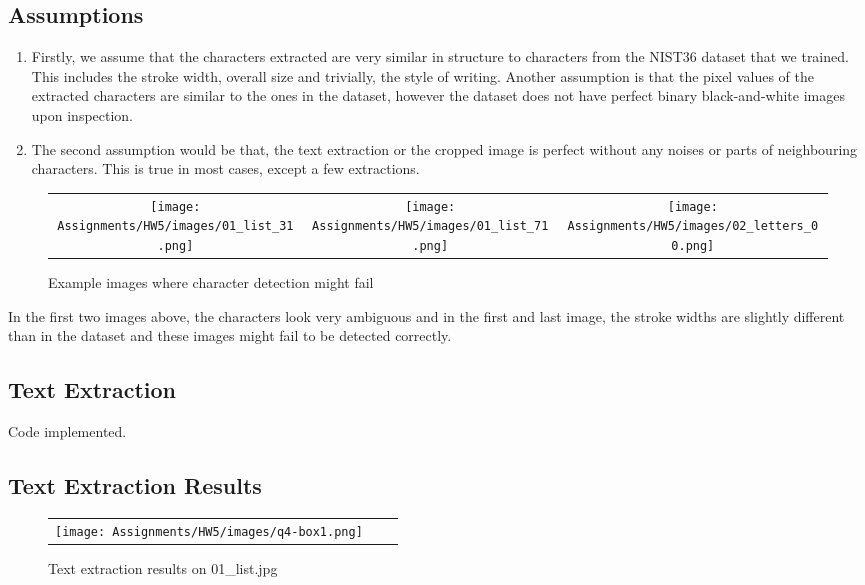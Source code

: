 \documentclass[a4paper]{article}
\begin{document}
\subsection{Assumptions}
\begin{enumerate}
    \item Firstly, we assume that the characters extracted are very similar in structure to characters from the NIST36 dataset that we trained. This includes the stroke width, overall size and trivially, the style of writing. Another assumption is that the pixel values of the extracted characters are similar to the ones in the dataset, however the dataset does not have perfect binary black-and-white images upon inspection.
    \item The second assumption would be that, the text extraction or the cropped image is perfect without any noises or parts of neighbouring characters. This is true in most cases, except a few extractions.
\end{enumerate}

\begin{figure}[!ht]
\centering
\begin{tabular}{ccc}
{\texttt{[image: Assignments/HW5/images/01\_list\_31.png]}} &
{\texttt{[image: Assignments/HW5/images/01\_list\_71.png]}} &
{\texttt{[image: Assignments/HW5/images/02\_letters\_00.png]}}
\end{tabular}
\caption{Example images where character detection might fail}
\end{figure}

In the first two images above, the characters look very ambiguous and in the first and last image, the stroke widths are slightly different than in the dataset and these images might fail to be detected correctly.

\subsection{Text Extraction}
Code implemented.

\subsection{Text Extraction Results}
\begin{figure}[!ht]
\centering
\begin{tabular}{ccc}
{\texttt{[image: Assignments/HW5/images/q4-box1.png]}}
\end{tabular}
\caption{Text extraction results on 01\_list.jpg}
\end{figure}
\end{document}

